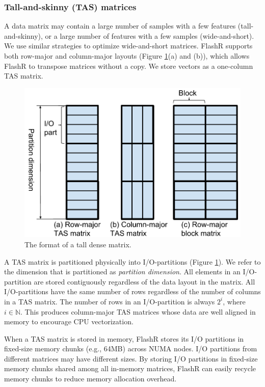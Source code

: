 \subsubsection{Tall-and-skinny (TAS) matrices}
A data matrix may contain a large number of samples with a few features
(tall-and-skinny),
or a large number of features with a few samples (wide-and-short).
We use similar strategies to optimize wide-and-short matrices. FlashR
supports both row-major and column-major layouts (Figure \ref{fig:den_mat}(a)
and (b)), which allows FlashR to transpose matrices without a copy.
We store vectors as a one-column TAS matrix.

\begin{figure}
	\centering
	\includegraphics[scale=0.5]{FlashMatrix_figs/dense_matrix2.pdf}
	\vspace{-5pt}
	\caption{The format of a tall dense matrix.}
	\label{fig:den_mat}
  \vspace{-12pt}
\end{figure}

A TAS matrix is partitioned physically into I/O-partitions (Figure
\ref{fig:den_mat}). We refer to the dimension that is partitioned as
\textit{partition dimension}. All elements in an I/O-partition are stored
contiguously regardless of the data layout in the matrix. All I/O-partitions
have the same number of rows regardless of the number of columns in a TAS
matrix. The number of rows in an I/O-partition is always $2^i$, where
$i \in \mathbb{N}$. This produces column-major TAS
matrices whose data are well aligned in memory to encourage CPU vectorization.

When a TAS matrix is stored in memory, FlashR stores its I/O partitions in
fixed-size memory chunks (e.g., 64MB) across NUMA nodes.
I/O partitions from different matrices may have different sizes. By storing
I/O partitions in fixed-size memory chunks shared among all in-memory matrices,
FlashR can easily recycle memory chunks to reduce memory allocation overhead.

